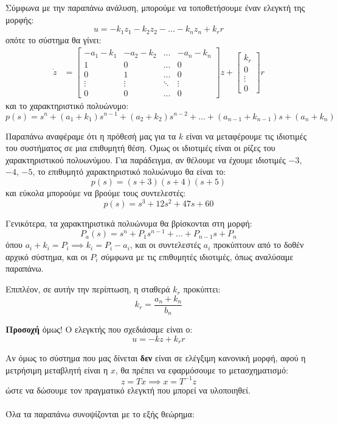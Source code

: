\documentclass[11pt,a4paper,notitlepage,fleqn]{article}
\begin{document}
Σύμφωνα με την παραπάνω ανάλυση, μπορούμε να τοποθετήσουμε έναν
ελεγκτή της μορφής:
\[
u = -k_1 z_1 - k_2z_2 - \dots - k_nz_n + k_r r
\]
οπότε το σύστημα θα γίνει:
\begin{align*}
\dot z &= \left[\begin{matrix}
-a_1-k_1 & -a_2-k_2 & \hdots & -a_n-k_n \\
1 & 0 & \hdots & 0\\
0 & 1 & \hdots & 0 \\
\vdots & \vdots & \ddots &\vdots \\
0 & 0 & \hdots & 0
\end{matrix}\right]z + \left[\begin{matrix}
k_r \\ 0 \\ \vdots \\ 0
\end{matrix}\right]r
\end{align*}
και το χαρακτηριστικό πολυώνυμο:
\[
p(s) = s^n + (a_1+k_1)s^{n-1} + (a_2+k_2)s^{n-2} + \dots + (a_{n-1} + k_{n-1})s + (a_n+k_n)
\]

Παραπάνω αναφέραμε ότι η πρόθεσή μας για τα \( k \) είναι να μεταφέρουμε
τις ιδιοτιμές του συστήματος σε μια επιθυμητή θέση. Όμως οι ιδιοτιμές
είναι οι ρίζες του χαρακτηριστικού πολυωνύμου. Για παράδειγμα, αν θέλουμε
να έχουμε ιδιοτιμές \( -3 \), \( -4 \), \( -5 \), το επιθυμητό χαρακτηριστικό
πολυώνυμο θα είναι το:
\[
p(s) = (s+3)(s+4)(s+5)
\]
και εύκολα μπορούμε να βρούμε τους συντελεστές:
\[
p(s) = s^3 + 12s^2 + 47s + 60
\]

Γενικότερα, τα χαρακτηριστικά πολυώνυμα θα βρίσκονται στη μορφή:
\[
P_a(s) = s^n + P_1s^{n-1} + \dots + P_{n-1}s+P_n
\]
όπου \( a_i+k_i = P_i \implies k_i = P_i - a_i \), και οι συντελεστές
\( a_i \) προκύπτουν από το δοθέν αρχικό σύστημα, και οι \( P_i \)
σύμφωνα με τις επιθυμητές ιδιοτιμές, όπως αναλύσαμε παραπάνω.

Επιπλέον, σε αυτήν την περίπτωση, η σταθερά \( k_r \) προκύπτει:
\[
k_r = \frac{a_n+k_n}{b_n}
\]

\textbf{Προσοχή} όμως! Ο ελεγκτής που σχεδιάσαμε είναι ο:
\[
u = -kz +k_r r
\]

Αν όμως το σύστημα που μας δίνεται \textbf{δεν} είναι σε ελέγξιμη κανονική μορφή, αφού η μετρήσιμη μεταβλητή είναι η \( x \), θα πρέπει να εφαρμόσουμε
το μετασχηματισμό:
\[
z = Tx \implies x = T^{-1}z
\]
ώστε να δώσουμε τον πραγματικό ελεγκτή που μπορεί να υλοποιηθεί.

\paragraph{}
Όλα τα παραπάνω συνοψίζονται με το εξής θεώρημα:
\end{document}
